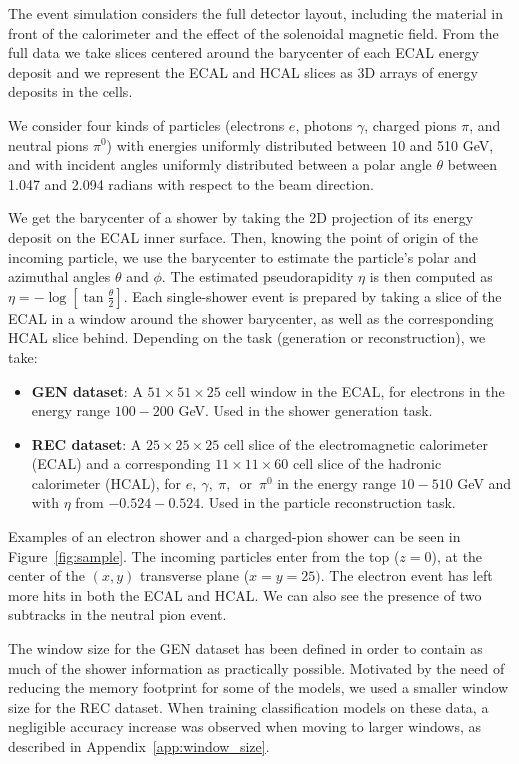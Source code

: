 The event simulation considers the full detector layout, including the material in front of the calorimeter and the effect of the solenoidal magnetic field. From the full data we take slices centered around the barycenter of each ECAL energy deposit and we represent the ECAL and HCAL slices as 3D arrays of energy deposits in the cells. 

We consider four kinds of particles (electrons $e$, photons $\gamma$, charged pions $\pi$, and neutral pions $\pi^0$) with energies uniformly distributed between 10 and 510 GeV, and with incident angles uniformly distributed between a polar angle $\theta$ between 1.047 and 2.094 radians with respect to the beam direction.

We get the barycenter of a shower by taking the 2D projection of its energy deposit on the ECAL inner surface. Then, knowing the point of origin of the incoming particle, we use the barycenter to estimate the particle's polar and azimuthal angles $\theta$ and $\phi$. The estimated pseudorapidity $\eta$ is then computed as $\eta=-\log[\tan\frac{\theta}{2}]$. Each single-shower event is prepared by taking a slice of the ECAL in a window around the shower barycenter, as well as the corresponding HCAL slice behind. Depending on the task (generation or reconstruction), we take:
\begin{itemize}
  \item {\bf GEN dataset}: A $51 \times 51 \times 25$ cell window in the
    ECAL, for electrons in the energy range $100-200$ GeV. Used in the shower generation task.
  \item {\bf REC dataset}: A $25 \times
    25 \times 25$ cell slice of the electromagnetic calorimeter (ECAL)
    and a corresponding $11 \times 11 \times 60$ cell slice of the
    hadronic calorimeter (HCAL), for $e,~\gamma,~\pi,$~or~$\pi^0$ in the energy range $10-510$ GeV and with $\eta$ from $-0.524-0.524$. Used in the particle reconstruction task.
\end{itemize}


Examples of an electron shower and a charged-pion shower can be seen in Figure~\ref{fig:sample}. The incoming particles enter from the top ($z=0$), at the center of the $(x,y)$ transverse plane ($x=y=25)$. The electron event has left more hits in both the ECAL and HCAL. We can also see the presence of two subtracks in the neutral pion event. %

The window size for the GEN dataset has been defined in order to contain as much of the shower information as practically possible.  
Motivated by the need of reducing the memory footprint for some of the models, we used a smaller window size for the REC dataset. When training classification models on these data, a negligible accuracy increase was observed when moving to larger windows, as described in Appendix~\ref{app:window_size}.

